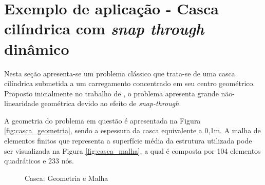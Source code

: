 \section{Exemplo de aplicação - Casca cilíndrica com \textit{snap through} dinâmico}

Nesta seção apresenta-se um problema clássico que trata-se de uma casca cilíndrica submetida a um carregamento concentrado em seu centro geométrico. Proposto inicialmente no trabalho de 
\cite{KuhlR:1999}, o problema apresenta grande não-linearidade geométrica devido ao efeito de \textit{snap-through}. 

A geometria do problema em questão é apresentada na Figura \ref{fig:casca_geometria}, sendo a espessura da casca equivalente a 0,1m.  A malha de elementos finitos que representa a superfície média da estrutura utilizada pode ser visualizada na Figura \ref{fig:casca_malha}, a qual é composta por 104 elementos quadráticos e 233 nós. 

\begin{figure}[!htbp]
	\caption{Casca: Geometria e Malha}
	\centering
	\label{fig:Casca}
\end{figure}

